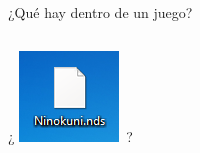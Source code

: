 \begin{frame}{¿Qué hay dentro de un juego?}
    \fontsize{45}{0}\selectfont
    \begin{columns}
    \begin{column}{0.65\textwidth}
        ¿ \includegraphics{imgs/gamefile.png}~?
    \end{column}
    \hfill
    \begin{column}{0.35\textwidth}
    \end{column}
    \end{columns}
\end{frame}

